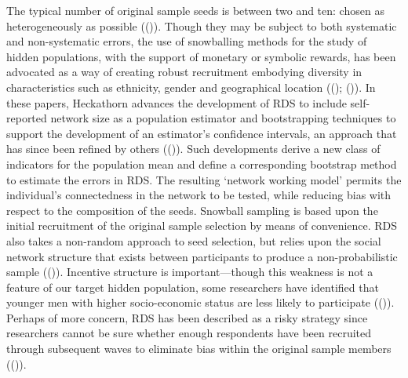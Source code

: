 \documentclass[
  12pt,
]{article}
\theoremstyle{plain}
\theoremstyle{definition}
\begin{document}
The typical number of original sample seeds is between two and ten:
chosen as heterogeneously as possible
(()).
Though they may be subject to both systematic and non-systematic errors,
the use of snowballing methods for the study of hidden populations, with
the support of monetary or symbolic rewards, has been advocated as a way
of creating robust recruitment embodying diversity in characteristics
such as ethnicity, gender and geographical location
(();
()).
In these papers, Heckathorn advances the development of RDS to include
self-reported network size as a population estimator and bootstrapping
techniques to support the development of an estimator's confidence
intervals, an approach that has since been refined by others
(()).
Such developments derive a new class of indicators for the population
mean and define a corresponding bootstrap method to estimate the errors
in RDS. The resulting `network working model' permits the individual's
connectedness in the network to be tested, while reducing bias with
respect to the composition of the seeds. Snowball sampling is based upon
the initial recruitment of the original sample selection by means of
convenience. RDS also takes a non-random approach to seed selection, but
relies upon the social network structure that exists between
participants to produce a non-probabilistic sample
(()).
Incentive structure is important---though this weakness is not a feature
of our target hidden population, some researchers have identified that
younger men with higher socio-economic status are less likely to
participate
(()).
Perhaps of more concern, RDS has been described as a risky strategy
since researchers cannot be sure whether enough respondents have been
recruited through subsequent waves to eliminate bias within the original
sample members
(()).
\end{document}
